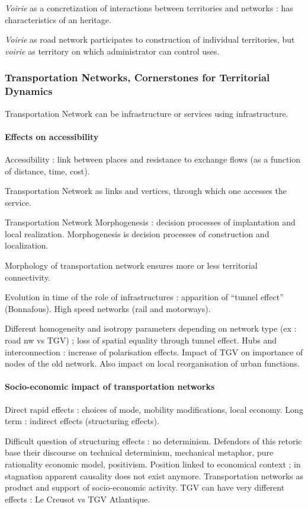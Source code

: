 \textit{Voirie} as a concretization of interactions between territories and networks : has characteristics of an heritage.

\textit{Voirie} as road network participates to construction of individual territories, but \textit{voirie} as territory on which administrator can control uses.


\subsubsection*{Transportation Networks, Cornerstones for Territorial Dynamics}

Transportation Network can be infrastructure or services using infrastructure.

\paragraph{Effects on accessibility}

Accessibility : link between places and resistance to exchange flows (as a function of distance, time, cost).

Transportation Network as links and vertices, through which one accesses the service.

Transportation Network Morphogenesis : decision processes of implantation and local realization. Morphogenesis is decision processes of construction and localization.

Morphology of transportation network ensures more or less territorial connectivity.

Evolution in time of the role of infrastructures : apparition of ``tunnel effect'' (Bonnafous). High speed networks (rail and motorways).

Different homogeneity and isotropy parameters depending on network type (ex : road nw vs TGV) ; loss of spatial equality through tunnel effect. Hubs and interconnection : increase of polarisation effects. Impact of TGV on importance of nodes of the old network. Also impact on local reorganisation of urban functions.

\paragraph{Socio-economic impact of transportation networks}

Direct rapid effects : choices of mode, mobility modifications, local economy. Long term : indirect effects (structuring effects).

Difficult question of structuring effects : no determinism. Defendors of this retoric base their discourse on technical determinism, mechanical metaphor, pure rationality economic model, positivism. Position linked to economical context ; in stagnation apparent causality does not exist anymore. Transportation networks as product and support of socio-economic activity. TGV can have very different effects : Le Creusot vs TGV Atlantique.

